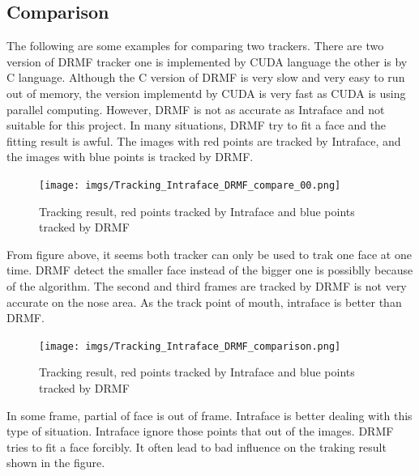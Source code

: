 \subsection{Comparison}
The following are some examples for comparing two trackers. There are two version of DRMF tracker one is implemented by CUDA language the other is by C language. Although the C version of DRMF is very slow and very easy to run out of memory, the version implementd by CUDA is very fast as CUDA is using parallel computing. However, DRMF is not as accurate as Intraface and not suitable for this project. In many situations, DRMF try to fit a face and the fitting result is awful. The images with red points are tracked by Intraface, and the images with blue points is tracked by DRMF.
\begin{figure}[h!]
\centering
\texttt{[image: imgs/Tracking\_Intraface\_DRMF\_compare\_00.png]}
\caption{Tracking result, red points tracked by Intraface and blue points tracked by DRMF}
\end{figure}
From figure above, it seems both tracker can only be used to trak one face at one time. DRMF detect the smaller face instead of the bigger one is possiblly because of the algorithm. The second and third frames are tracked by DRMF is not very accurate on the nose area. As the track point of mouth, intraface is better than DRMF.
\begin{figure}[h!]
\centering
\texttt{[image: imgs/Tracking\_Intraface\_DRMF\_comparison.png]}
\caption{Tracking result, red points tracked by Intraface and blue points tracked by DRMF}
\end{figure}
In some frame, partial of face is out of frame. Intraface is better dealing with this type of situation. Intraface ignore those points that out of the images. DRMF tries to fit a face forcibly. It often lead to bad influence on the traking result shown in the figure.
